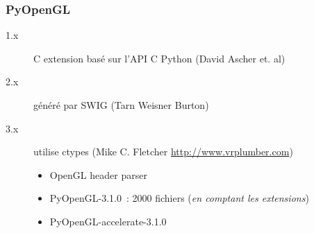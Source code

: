 \begin{frame}
  \frametitle{PyOpenGL}
  \begin{description}
  \item[1.x] C extension basé sur l'API C Python {\tiny (David Ascher et. al)}
  \item[2.x] généré par SWIG {\tiny (Tarn Weisner Burton)}
  \item[3.x] utilise ctypes {\tiny (Mike C. Fletcher \url{http://www.vrplumber.com})}
    \begin{itemize}
    \item OpenGL header parser
    \item PyOpenGL-3.1.0~: 2000 fichiers (\emph{en comptant les extensions})
    \item PyOpenGL-accelerate-3.1.0
    \end{itemize}
  \end{description}
\end{frame}

